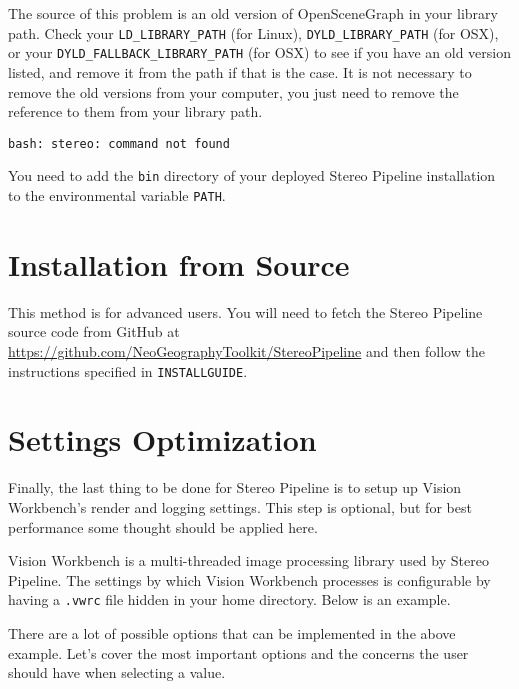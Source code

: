 The source of this problem is an old version of OpenSceneGraph in
your library path. Check your \verb#LD_LIBRARY_PATH# (for Linux),
\verb#DYLD_LIBRARY_PATH# (for OSX), or your \verb#DYLD_FALLBACK_LIBRARY_PATH#
(for OSX) to see if you have an old version listed, and remove it
from the path if that is the case. It is not necessary to remove the
old versions from your computer, you just need to remove the reference
to them from your library path.

\begin{verbatim}
bash: stereo: command not found
\end{verbatim}

You need to add the \texttt{bin} directory of your deployed Stereo
Pipeline installation to the environmental variable \texttt{PATH}.

\section{\label{sec:Source-Installation}Installation from Source}

This method is for advanced users. You will need to fetch the Stereo Pipeline source code from GitHub at
\url{https://github.com/NeoGeographyToolkit/StereoPipeline} and then
follow the instructions specified in \texttt{INSTALLGUIDE}.

\section{\label{sec:Settings}Settings Optimization}

Finally, the last thing to be done for Stereo Pipeline is to setup up
Vision Workbench's render and logging settings. This step is optional,
but for best performance some thought should be applied here.

Vision Workbench is a multi-threaded image processing library used by
Stereo Pipeline. The settings by which Vision Workbench processes is
configurable by having a \texttt{.vwrc} file hidden in your home
directory. Below is an example.

\newpage
\begin{minipage}{0.94\linewidth}
\small{}
\end{minipage}

There are a lot of possible options that can be implemented in the
above example. Let's cover the most important options and the concerns
the user should have when selecting a value.

